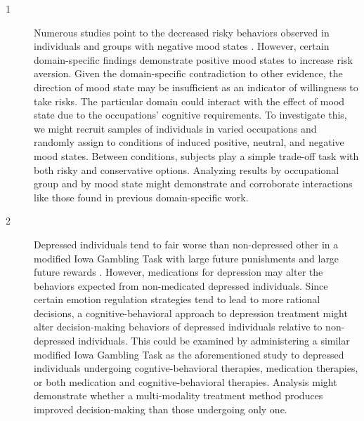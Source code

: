 \documentclass[12pt,a4paper]{article}
\begin{document}
\begin{description}

\item[1] Numerous studies point to the decreased risky behaviors observed in
individuals and groups with negative mood states
\autocite{Yuen2003,VanKnippenberg2010,VonHelversen2011,DeVries2012}. However,
certain domain-specific findings \autocite{Morgan2013} demonstrate positive mood
states to increase risk aversion. Given the domain-specific contradiction to
other evidence, the direction of mood state may be insufficient as an indicator
of willingness to take risks. The particular domain could interact with the
effect of mood state due to the occupations' cognitive requirements. To
investigate this, we might recruit samples of individuals in varied occupations
and randomly assign to conditions of induced positive, neutral, and negative mood states. Between
conditions, subjects play a simple trade-off task with both risky and
conservative options. Analyzing results by occupational group and by mood state
might demonstrate and corroborate interactions like those found in previous domain-specific
work.

\item[2] Depressed individuals tend to fair worse than non-depressed other in a modified Iowa Gambling
Task with large future punishments and large future rewards \autocite{Must2006}.
However, medications for depression may alter the behaviors expected from
non-medicated depressed individuals. Since certain emotion regulation strategies tend
to lead to more rational decisions, a cognitive-behavioral approach to
depression treatment might alter decision-making behaviors of depressed
individuals relative to non-depressed individuals. This could be examined by
administering a similar modified Iowa Gambling Task as the aforementioned study
to depressed individuals undergoing cogntive-behavioral therapies, medication
therapies, or both medication and cognitive-behavioral therapies. Analysis might demonstrate
whether a multi-modality treatment method produces improved decision-making
than those undergoing only one.

\end{description}

\printbibliography[
  title={References}
]
\end{document}
